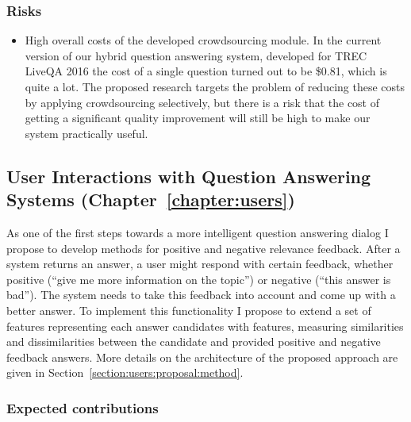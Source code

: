 \subsubsection{Risks}
\label{section:proposal:plan:crowdsourcing:risks}

\begin{itemize}
\item High overall costs of the developed crowdsourcing module.
In the current version of our hybrid question answering system, developed for TREC LiveQA 2016 the cost of a single question turned out to be \$0.81, which is quite a lot.
The proposed research targets the problem of reducing these costs by applying crowdsourcing selectively, but there is a risk that the cost of getting a significant quality improvement will still be high to make our system practically useful.
\end{itemize}

\subsection{User Interactions with Question Answering Systems (Chapter~\ref{chapter:users})}
\label{section:proposal:plan:users}

As one of the first steps towards a more intelligent question answering dialog I propose to develop methods for positive and negative relevance feedback.
After a system returns an answer, a user might respond with certain feedback, whether positive (\eg ``give me more information on the topic'') or negative (\eg ``this answer is bad'').
The system needs to take this feedback into account and come up with a better answer.
To implement this functionality I propose to extend a set of features representing each answer candidates with features, measuring similarities and dissimilarities between the candidate and provided positive and negative feedback answers.
More details on the architecture of the proposed approach are given in Section~\ref{section:users:proposal:method}.

\subsubsection{Expected contributions}
\label{section:proposal:plan:users:contributions}

